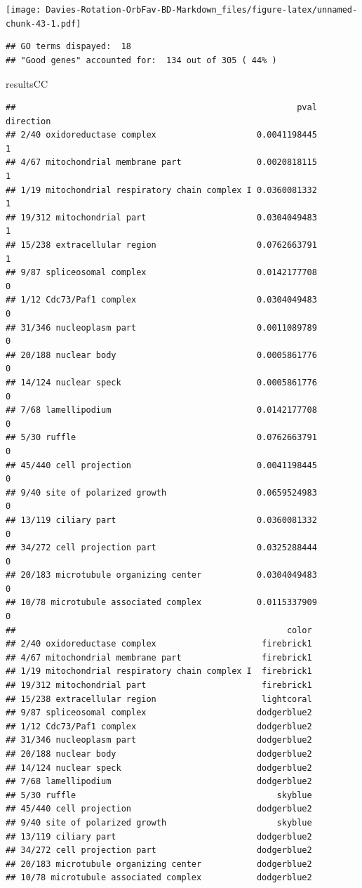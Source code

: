 \documentclass[
]{article}
\newenvironment{Shaded}{\begin{snugshade}}{\end{snugshade}}
\newcommand{\NormalTok}[1]{#1}
\begin{document}
\texttt{[image: Davies-Rotation-OrbFav-BD-Markdown\_files/figure-latex/unnamed-chunk-43-1.pdf]}

\begin{verbatim}
## GO terms dispayed:  18 
## "Good genes" accounted for:  134 out of 305 ( 44% )
\end{verbatim}

\begin{Shaded}
\begin{Highlighting}[]
\NormalTok{resultsCC}
\end{Highlighting}
\end{Shaded}

\begin{verbatim}
##                                                        pval direction
## 2/40 oxidoreductase complex                    0.0041198445         1
## 4/67 mitochondrial membrane part               0.0020818115         1
## 1/19 mitochondrial respiratory chain complex I 0.0360081332         1
## 19/312 mitochondrial part                      0.0304049483         1
## 15/238 extracellular region                    0.0762663791         1
## 9/87 spliceosomal complex                      0.0142177708         0
## 1/12 Cdc73/Paf1 complex                        0.0304049483         0
## 31/346 nucleoplasm part                        0.0011089789         0
## 20/188 nuclear body                            0.0005861776         0
## 14/124 nuclear speck                           0.0005861776         0
## 7/68 lamellipodium                             0.0142177708         0
## 5/30 ruffle                                    0.0762663791         0
## 45/440 cell projection                         0.0041198445         0
## 9/40 site of polarized growth                  0.0659524983         0
## 13/119 ciliary part                            0.0360081332         0
## 34/272 cell projection part                    0.0325288444         0
## 20/183 microtubule organizing center           0.0304049483         0
## 10/78 microtubule associated complex           0.0115337909         0
##                                                      color
## 2/40 oxidoreductase complex                     firebrick1
## 4/67 mitochondrial membrane part                firebrick1
## 1/19 mitochondrial respiratory chain complex I  firebrick1
## 19/312 mitochondrial part                       firebrick1
## 15/238 extracellular region                     lightcoral
## 9/87 spliceosomal complex                      dodgerblue2
## 1/12 Cdc73/Paf1 complex                        dodgerblue2
## 31/346 nucleoplasm part                        dodgerblue2
## 20/188 nuclear body                            dodgerblue2
## 14/124 nuclear speck                           dodgerblue2
## 7/68 lamellipodium                             dodgerblue2
## 5/30 ruffle                                        skyblue
## 45/440 cell projection                         dodgerblue2
## 9/40 site of polarized growth                      skyblue
## 13/119 ciliary part                            dodgerblue2
## 34/272 cell projection part                    dodgerblue2
## 20/183 microtubule organizing center           dodgerblue2
## 10/78 microtubule associated complex           dodgerblue2
\end{verbatim}
\end{document}
